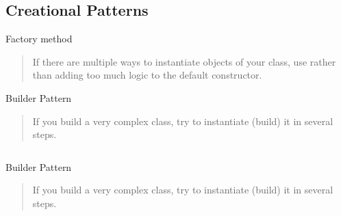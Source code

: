 \subsection{Creational Patterns}


\begin{frame}[t]{Factory method}
	\begin{quote}
		If there are multiple ways to instantiate objects of your class, use  rather than adding too much logic to the default constructor.
	\end{quote}
	
	\medskip
\end{frame}

\begin{frame}[t]{Builder Pattern}
	\begin{quote}
		If you build a very complex class, try to instantiate (build) it in several steps.
	\end{quote}

	\inputminted{python}{code/patterns/creational/builder_bad.py}	
\end{frame}

\begin{frame}[t]{Builder Pattern}
	\begin{quote}
		If you build a very complex class, try to instantiate (build) it in several steps.
	\end{quote}

	\inputminted{python}{code/patterns/creational/builder_bad_2.py}	

\end{frame}

